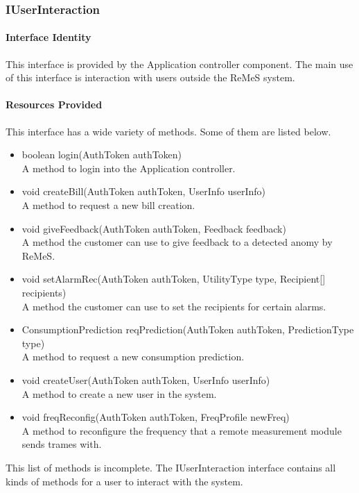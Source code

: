 \subsubsection{IUserInteraction}
\label{sec:IUserInteraction}
\paragraph{Interface Identity}
This interface is provided by the Application controller component. The main
	use of this interface is interaction with users outside the ReMeS system.
\paragraph{Resources Provided}
This interface has a wide variety of methods. Some of them are listed below.
\begin{itemize}
	\item{boolean login(AuthToken authToken)}\\
	A method to login into the Application controller.
	\item{void createBill(AuthToken authToken, UserInfo userInfo)}\\
	A method to request a new bill creation.
	\item{void giveFeedback(AuthToken authToken, Feedback feedback)}\\
	A method the customer can use to give feedback to a detected anomy by ReMeS.
	\item{void setAlarmRec(AuthToken authToken, UtilityType type, Recipient[] recipients)}\\
	A method the customer can use to set the recipients for certain alarms.
	\item{ConsumptionPrediction reqPrediction(AuthToken authToken, PredictionType type)}\\
	A method to request a new consumption prediction.
	\item{void createUser(AuthToken authToken, UserInfo userInfo)}\\
	A method to create a new user in the system.
	\item{void freqReconfig(AuthToken authToken, FreqProfile newFreq)}\\
	A method to reconfigure the frequency that a remote measurement module sends trames with.
\end{itemize}
This list of methods is incomplete. The IUserInteraction interface contains all kinds of methods for
	a user to interact with the system.

